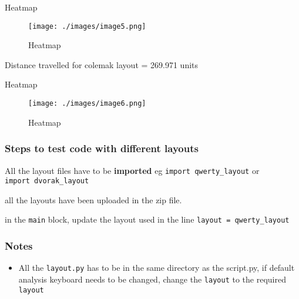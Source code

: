 Heatmap

\begin{figure}
\centering
\texttt{[image: ./images/image5.png]}
\caption{Heatmap}
\end{figure}

Distance travelled for colemak layout = 269.971 units

Heatmap

\begin{figure}
\centering
\texttt{[image: ./images/image6.png]}
\caption{Heatmap}
\end{figure}

\subsubsection{Steps to test code with different
layouts}\label{steps-to-test-code-with-different-layouts}

All the layout files have to be \textbf{imported} eg
\texttt{import\ qwerty\_layout} or \texttt{import\ dvorak\_layout}

all the layouts have been uploaded in the zip file.

in the \texttt{main} block, update the layout used in the line
\texttt{layout\ =\ qwerty\_layout}

\subsubsection{Notes}\label{notes}

\begin{itemize}
\tightlist
\item
  All the \texttt{layout.py} has to be in the same directory as the
  script.py, if default analysis keyboard needs to be changed, change
  the \texttt{layout} to the required \texttt{layout}
\end{itemize}
